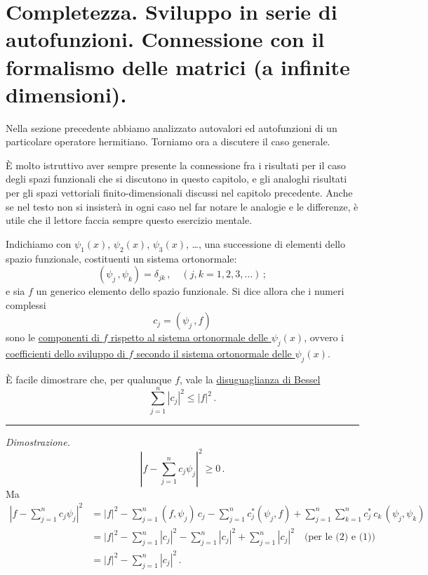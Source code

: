 \documentclass[11pt, a4paper]{book}
\numberwithin{equation}{section}
\begin{document}
\section{Completezza. Sviluppo in serie di autofunzioni. Connessione con il formalismo delle matrici (a infinite dimensioni).}

Nella sezione precedente abbiamo analizzato autovalori ed autofunzioni di un particolare operatore hermitiano. Torniamo ora a discutere il caso generale.

È molto istruttivo aver sempre presente la connessione fra i risultati per il caso degli spazi funzionali che si discutono in questo capitolo, e gli analoghi risultati per gli spazi vettoriali finito-dimensionali discussi nel capitolo precedente. Anche se nel testo non si insisterà in ogni caso nel far notare le analogie e le differenze, è utile che il lettore faccia sempre questo esercizio mentale.

Indichiamo con $\psi_1(x)$, $\psi_2(x)$, $\psi_3(x)$, \ldots, una successione di elementi dello spazio funzionale, costituenti un sistema ortonormale:
\begin{equation}
(\psi_j\,,\psi_k)=\delta_{jk}\,,\quad (j,k=1,2,3,\ldots)\,;
\end{equation}
e sia $f$ un generico elemento dello spazio funzionale. Si dice allora che i numeri complessi
\begin{equation}
c_j=(\psi_j\,,f)
\end{equation}
sono le \uline{componenti di $f$ rispetto al sistema ortonormale delle $\psi_j(x)$}, ovvero i \uline{coefficienti dello sviluppo di $f$ secondo il sistema ortonormale delle $\psi_j(x)$}.

È facile dimostrare che, per qualunque $f$, vale la \uline{disuguaglianza di Bessel}
\begin{equation}
\sum_{j=1}^{n}|c_j|^2 \leq |f|^2\,.
\end{equation}

\hrule
\medskip
\noindent\textit{Dimostrazione.}
\[
\left|f-\sum_{j=1}^{n}c_j\psi_j\right|^2\geq 0\,.
\]
Ma
\begin{align*}
\left|f-\sum_{j=1}^{n}c_j\psi_j\right|^2
&= |f|^2
  -\sum_{j=1}^{n}(f,\psi_j)\,c_j
  -\sum_{j=1}^{n}c_j^*(\psi_j,f)
  +\sum_{j=1}^{n}\sum_{k=1}^{n}c_j^*\,c_k\,(\psi_j,\psi_k) \\
&= |f|^2-\sum_{j=1}^{n}|c_j|^2-\sum_{j=1}^{n}|c_j|^2+\sum_{j=1}^{n}|c_j|^2
   \quad\text{(per le (2) e (1))}\\
&= |f|^2-\sum_{j=1}^{n}|c_j|^2\,.
\end{align*}
\end{document}
